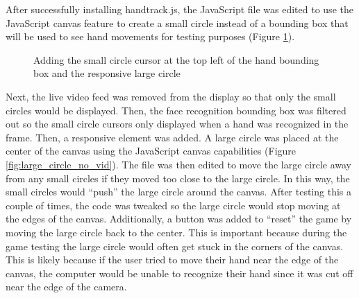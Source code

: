 \documentclass[10pt,twocolumn]{article}
\begin{document}
After successfully installing handtrack.js, the JavaScript file was edited to use the JavaScript canvas feature to create a small circle instead of a bounding box that will be used to see hand movements for testing purposes (Figure \ref{fig:large_circle}). 

\begin{figure}[hbh]
\begin{center}
\vspace{.5cm}
\caption{Adding the small circle cursor at the top left of the hand bounding box and the responsive large circle}
\label{fig:large_circle}
\end{center}
\end{figure}

Next, the live video feed was removed from the display so that only the small circles would be displayed. Then, the face recognition bounding box was filtered out so the small circle cursors only displayed when a hand was recognized in the frame.  Then, a responsive element was added. A large circle was placed at the center of the canvas using the JavaScript canvas capabilities (Figure \ref{fig:large_circle_no_vid}).  The file was then edited to move the large circle away from any small circles if they moved too close to the large circle.  In this way, the small circles would ``push'' the large circle around the canvas.  After testing this a couple of times, the code was tweaked so the large circle would stop moving at the edges of the canvas. Additionally, a button was added to ``reset'' the game by moving the large circle back to the center.  This is important because during the game testing the large circle would often get stuck in the corners of the canvas. This is likely because if the user tried to move their hand near the edge of the canvas, the computer would be unable to recognize their hand since it was cut off near the edge of the camera.  
\end{document}
